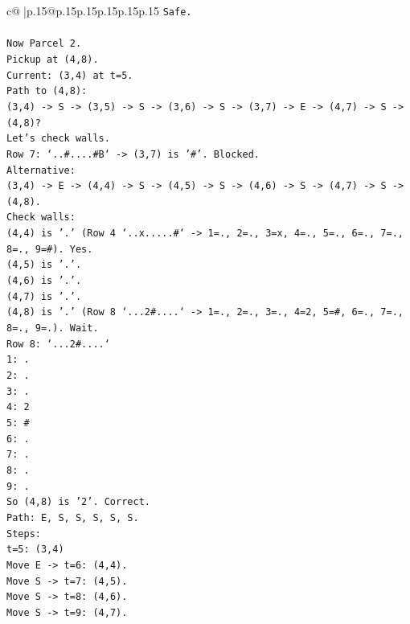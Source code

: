 \documentclass{article}
\begin{document}
{\begin{supertabular}{c@{$\;$}|p{.15\linewidth}@{}p{.15\linewidth}p{.15\linewidth}p{.15\linewidth}p{.15\linewidth}p{.15\linewidth}}
{{{\texttt{Safe.} \\
\\ 
\texttt{Now Parcel 2.} \\
\texttt{Pickup at (4,8).} \\
\texttt{Current: (3,4) at t=5.} \\
\texttt{Path to (4,8):} \\
\texttt{(3,4) {-}> S {-}> (3,5) {-}> S {-}> (3,6) {-}> S {-}> (3,7) {-}> E {-}> (4,7) {-}> S {-}> (4,8)?} \\
\texttt{Let's check walls.} \\
\texttt{Row 7: `..\#....\#B` {-}> (3,7) is '\#'. Blocked.} \\
\texttt{Alternative:} \\
\texttt{(3,4) {-}> E {-}> (4,4) {-}> S {-}> (4,5) {-}> S {-}> (4,6) {-}> S {-}> (4,7) {-}> S {-}> (4,8).} \\
\texttt{Check walls:} \\
\texttt{(4,4) is '.' (Row 4 `..x.....\#` {-}> 1=., 2=., 3=x, 4=., 5=., 6=., 7=., 8=., 9=\#). Yes.} \\
\texttt{(4,5) is '.'.} \\
\texttt{(4,6) is '.'.} \\
\texttt{(4,7) is '.'.} \\
\texttt{(4,8) is '.' (Row 8 `...2\#....` {-}> 1=., 2=., 3=., 4=2, 5=\#, 6=., 7=., 8=., 9=.). Wait.} \\
\texttt{Row 8: `...2\#....`} \\
\texttt{1: .} \\
\texttt{2: .} \\
\texttt{3: .} \\
\texttt{4: 2} \\
\texttt{5: \#} \\
\texttt{6: .} \\
\texttt{7: .} \\
\texttt{8: .} \\
\texttt{9: .} \\
\texttt{So (4,8) is '2'. Correct.} \\
\texttt{Path: E, S, S, S, S, S.} \\
\texttt{Steps:} \\
\texttt{t=5: (3,4)} \\
\texttt{Move E {-}> t=6: (4,4).} \\
\texttt{Move S {-}> t=7: (4,5).} \\
\texttt{Move S {-}> t=8: (4,6).} \\
\texttt{Move S {-}> t=9: (4,7).} \\
}}}
\end{supertabular}}
\end{document}
